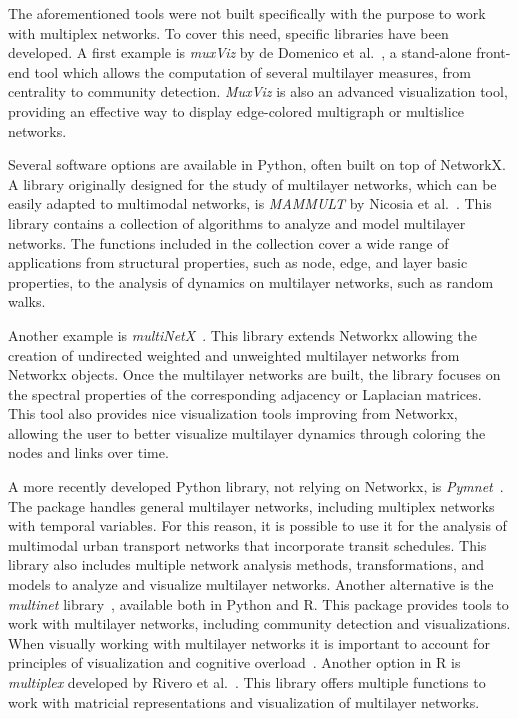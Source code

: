 The aforementioned tools were not built specifically with the purpose to work with multiplex networks. To cover this need, specific libraries have been developed. A first example is \textit{muxViz} by de Domenico et al.~\cite{dedomenico2015muxviz}, a stand-alone front-end tool which allows the computation of several multilayer measures, from centrality to community detection. \textit{MuxViz} is also an advanced visualization tool, providing an effective way to display edge-colored multigraph or multislice networks. 

Several software options are available in Python, often built on top of NetworkX. A library originally designed for the study of multilayer networks, which can be easily adapted to multimodal networks, is \textit{MAMMULT} by Nicosia et al.~\cite{nicosia2015mammult}. This library contains a collection of algorithms to analyze and model multilayer networks. The functions included in the collection cover a wide range of applications from structural properties, such as node, edge, and layer basic properties, to the analysis of dynamics on multilayer networks, such as random walks. 

Another example is \textit{multiNetX}~\cite{kouvaris2015pattern}. This library extends Networkx allowing the creation of undirected weighted and unweighted multilayer networks from Networkx objects. Once the multilayer networks are built, the library focuses on the spectral properties of the corresponding adjacency or Laplacian matrices. This tool also provides nice visualization tools improving from Networkx, allowing the user to better visualize multilayer dynamics through coloring the nodes and links over time. 

A more recently developed Python library, not relying on Networkx, is \textit{Pymnet}~\cite{kivela2018pymnet}. The package handles general multilayer networks, including multiplex networks with temporal variables. For this reason, it is possible to use it for the analysis of multimodal urban transport networks that incorporate transit schedules. This library also includes multiple network analysis methods, transformations, and models to analyze and visualize multilayer networks. Another alternative is the \textit{multinet} library~\cite{magnani2020multiplex}, available both in Python and R. This package provides tools to work with multilayer networks, including community detection and visualizations. When visually working with multilayer networks it is important to account for principles of visualization and cognitive overload~\cite{rossi2015towards}. Another option in R is \textit{multiplex} developed by Rivero et al.~\cite{rivero2020algebraic}. This library offers multiple functions to work with matricial representations and visualization of multilayer networks. 

